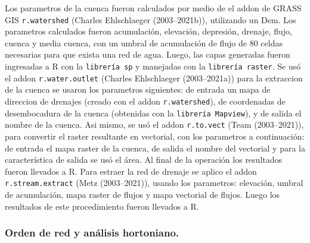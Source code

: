 \documentclass[11pt,]{article}
\begin{document}
Los parametros de la cuenca fueron calculados por medio de el addon de
GRASS GIS \texttt{r.watershed} (Charles Ehlschlaeger (2003--2021b)),
utilizando un Dem. Los parametros calculados fueron acumulación,
elevación, depresión, drenaje, flujo, cuenca y media cuenca, con un
umbral de acumulación de flujo de 80 celdas necesarias para que exista
una red de agua. Luego, las capas generadas fueron ingresadas a R con la
\texttt{librería\ sp} y manejadas con la \texttt{librería\ raster}. Se
usó el addon \texttt{r.water.outlet} (Charles Ehlschlaeger
(2003--2021a)) para la extraccion de la cuenca se usaron los parametros
siguientes: de entrada un mapa de direccion de drenajes (creado con el
addon \texttt{r.watershed}), de coordenadas de desembocadura de la
cuenca (obtenidas con la \texttt{librería\ Mapview}), y de salida el
nombre de la cuenca. Asi mismo, se usó el addon \texttt{r.to.vect} (Team
(2003--2021)), para convertir el raster resultante en vectorial, con los
parametros a continuación: de entrada el mapa raster de la cuenca, de
salida el nombre del vectorial y para la característica de salida se usó
el área. Al final de la operación los resultados fueron llevados a R.
Para estraer la red de drenaje se aplico el addon
\texttt{r.stream.extract} (Metz (2003--2021)), usando los parametros:
elevación, umbral de acumulación, mapa raster de flujos y mapa vectorial
de flujos. Luego los resultados de este procedimiento fueron llevados a
R.

\subsubsection{Orden de red y análisis
hortoniano.}\label{orden-de-red-y-anuxe1lisis-hortoniano.}
\end{document}

